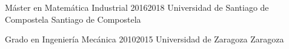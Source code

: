 \cvitem
    {Máster en Matemática Industrial} %
    {2016}{2018} %
    {Universidad de Santiago de Compostela} %
    {Santiago de Compostela} %

\vspace{10pt}
\cvitem
    {Grado en Ingeniería Mecánica} %
    {2010}{2015} %
    {Universidad de Zaragoza} %
    {Zaragoza} %
